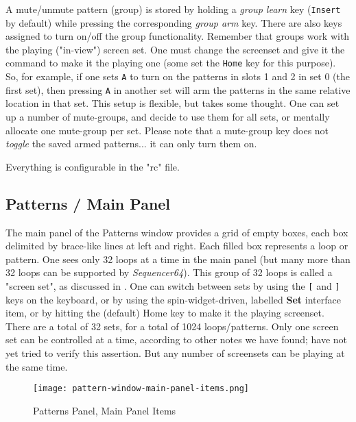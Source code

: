    A mute/unmute pattern (group) is stored by holding a
   \textsl{group learn} key (\texttt{Insert} by default) while pressing the
   corresponding \textsl{group arm} key.
   There are also keys assigned to turn on/off the group functionality.
   Remember that groups work with the playing ("in-view") screen set.
   One must change the screenset and give it the command to make it the
   playing one
   (some set the \texttt{Home} key for this purpose).
   So, for example, if one sets \texttt{A} to turn on the
   patterns in slots 1 and 2 in set 0 (the first set), then pressing
   \texttt{A} in another set will arm the patterns in the same relative
   location in that set.
   This setup is flexible, but takes some thought.
   One can set up a number of mute-groups, and decide to use them
   for all sets, or mentally allocate one mute-group per set.
   Please note that a mute-group key does not \textsl{toggle} the saved
   armed patterns... it can only turn them on.

   Everything is configurable in the "rc" file.

\subsection{Patterns / Main Panel}
\label{subsec:seq64_patterns_panel_main}

   The main panel of the Patterns window provides a grid of empty boxes,
   each box delimited by brace-like lines at left and right.
   Each filled box represents a loop or pattern.
   One sees only 32 loops at a time in the main panel (but many more than
   32 loops can be supported by \textsl{Sequencer64}).
   This group of 32 loops is called a "screen set", as discussed in
   .
   One can switch between sets by using the
   \index{keys![}
   \texttt{[} and
   \index{keys!]}
   \texttt{]} keys on the keyboard, or by using
   the spin-widget-driven, labelled \textbf{Set} interface item, or
   by hitting the (default) Home key to make it the playing screenset.
   There are a total of 32 sets, for a total of 1024 loops/patterns. 
   Only one screen set can be controlled at a time, according to other notes we
   have found; have not yet tried to verify this assertion.  But any number of
   screensets can be playing at the same time.

\begin{figure}[H]
   \centering 
   \texttt{[image: pattern-window-main-panel-items.png]}
   \caption{Patterns Panel, Main Panel Items}
   \label{fig:pattern_window_main_panel_items}
\end{figure}

